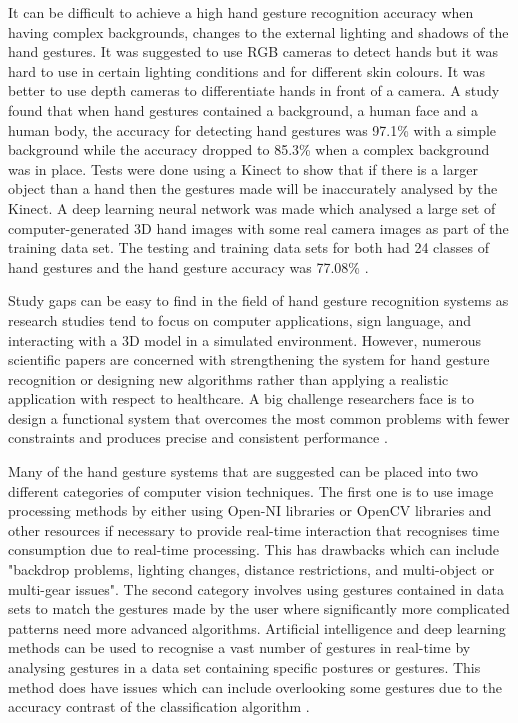 \documentclass{article}
\begin{document}
It can be difficult to achieve a high hand gesture recognition accuracy when having complex backgrounds, changes to the external lighting and shadows of the hand gestures. It was suggested to use RGB cameras to detect hands but it was hard to use in certain lighting conditions and for different skin colours. It was better to use depth cameras to differentiate hands in front of a camera. A study found that when hand gestures contained a background, a human face and a human body, the accuracy for detecting hand gestures was 97.1\% with a simple background while the accuracy dropped to 85.3\% when a complex background was in place. Tests were done using a Kinect to show that if there is a larger object than a hand then the gestures made will be inaccurately analysed by the Kinect. A deep learning neural network was made which analysed a large set of computer-generated 3D hand images with some real camera images as part of the training data set. The testing and training data sets for both had 24 classes of hand gestures and the hand gesture accuracy was 77.08\% \cite{yasen2019systematic}.

Study gaps can be easy to find in the field of hand gesture recognition systems as research studies tend to focus on computer applications, sign language, and interacting with a 3D model in a simulated environment. However, numerous scientific papers are concerned with strengthening the system for hand gesture recognition or designing new algorithms rather than applying a realistic application with respect to healthcare. A big challenge researchers face is to design a functional system that overcomes the most common problems with fewer constraints and produces precise and consistent performance \cite{jimaging6080073}.

Many of the hand gesture systems that are suggested can be placed into two different categories of computer vision techniques. The first one is to use image processing methods by either using Open-NI libraries or OpenCV libraries and other resources if necessary to provide real-time interaction that recognises time consumption due to real-time processing. This has drawbacks which can include "backdrop problems, lighting changes, distance restrictions, and multi-object or multi-gear issues". The second category involves using gestures contained in data sets to match the gestures made by the user where significantly more complicated patterns need more advanced algorithms. Artificial intelligence and deep learning methods can be used to recognise a vast number of gestures in real-time by analysing gestures in a data set containing specific postures or gestures. This method does have issues which can include overlooking some gestures due to the accuracy contrast of the classification algorithm \cite{jimaging6080073}.
\end{document}
